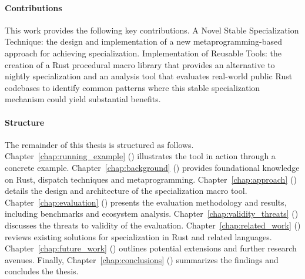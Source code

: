 \paragraph{Contributions}
This work provides the following key contributions.
A Novel Stable Specialization Technique: the design and implementation of a new metaprogramming-based approach for achieving specialization.
Implementation of Reusable Tools: the creation of a Rust procedural macro library that provides an alternative to nightly specialization and an analysis tool that evaluates real-world public Rust codebases to identify common patterns where this stable specialization mechanism could yield substantial benefits.

\paragraph{Structure}
The remainder of this thesis is structured as follows.
Chapter~\ref{chap:running_example} () illustrates the tool in action through a concrete example.
Chapter~\ref{chap:background} () provides foundational knowledge on Rust, dispatch techniques and metaprogramming.
Chapter~\ref{chap:approach} () details the design and architecture of the specialization macro tool.
Chapter~\ref{chap:evaluation} () presents the evaluation methodology and results, including benchmarks and ecosystem analysis.
Chapter~\ref{chap:validity_threats} () discusses the threats to validity of the evaluation.
Chapter~\ref{chap:related_work} () reviews existing solutions for specialization in Rust and related languages.
Chapter~\ref{chap:future_work} () outlines potential extensions and further research avenues.
Finally, Chapter~\ref{chap:conclusions} () summarizes the findings and concludes the thesis.

